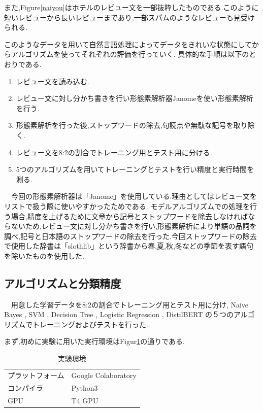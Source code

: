 \documentclass[twocolumn,dvipdfmx]{article}
\begin{document}
また,Figure\ref{naiyou}はホテルのレビュー文を一部抜粋したものである.このように短いレビューから長いレビューまであり,一部スパムのようなレビューも見受けられる.

このようなデータを用いて自然言語処理によってデータをきれいな状態にしてからアルゴリズムを使ってそれぞれの評価を行っていく.
具体的な手順は以下のとおりである.

\begin{enumerate}
  \item レビュー文を読み込む.
  \item レビュー文に対し分かち書きを行い形態素解析器Janomeを使い形態素解析を行う.
  \item 形態素解析を行った後,ストップワードの除去,句読点や無駄な記号を取り除く.
  \item レビュー文を8:2の割合でトレーニング用とテスト用に分ける.
  \item 5つのアルゴリズムを用いてトレーニングとテストを行い精度と実行時間を測る.
\end{enumerate}
　今回の形態素解析器は「Janome」を使用している.理由としてはレビュー文をリストで扱う際に使いやすかったためである.
モデルアルゴリズムでの処理を行う場合,精度を上げるために文章から記号とストップワードを除去しなければならないため,レビュー文に対し分かち書きを行い,形態素解析により単語の品詞を調べ,記号と日本語のストップワードの除去を行った.今回ストップワードの除去で使用した辞書は「slothlib」\cite{slothlib}という辞書から春,夏,秋,冬などの季節を表す語句を除いたものを使用した.


 \subsection{アルゴリズムと分類精度}
 　用意した学習データを8:2の割合でトレーニング用とテスト用に分け, Naive Bayes  , SVM , Decision Tree , Logistic Regression , DistilBERT の５つのアルゴリズムでトレーニングおよびテストを行った.
  
 まず,初めに実験に用いた実行環境はFigur\ref{setting}の通りである.
 
\begin{table}[H] \centering
  \caption{実験環境}
  \label{setting}
\begin{tabular}{ll} \hline
 プラットフォーム & Google Colaboratory \\
 コンパイラ & Python3 \\
 GPU & T4 GPU \\ \hline
\end{tabular}
\end{table}
  
\end{document}

